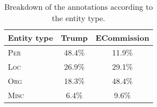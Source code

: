 \documentclass[11pt]{article}
\begin{document}
\begin{table}
  \begin{center}
    \begin{footnotesize}
      \begin{tabular}{lcc}
        \toprule 
        Entity type & {\textbf{{\sc Trump}}} & {\textbf{{\sc ECommission}}} \\
        \midrule
	\textsc{Per} & 48.4\% & 11.9\% \\
	\textsc{Loc} & 26.9\% & 29.1\% \\
	\textsc{Org} & 18.3\% & 48.4\% \\
	\textsc{Misc} & \phantom{0}6.4\% & \phantom{0}9.6\% \\
        \bottomrule
      \end{tabular}
    \end{footnotesize}
  \end{center}
  \caption{Breakdown of the annotations according to the entity type.}
  \label{tab:datasets-2}
\end{table}
\end{document}
